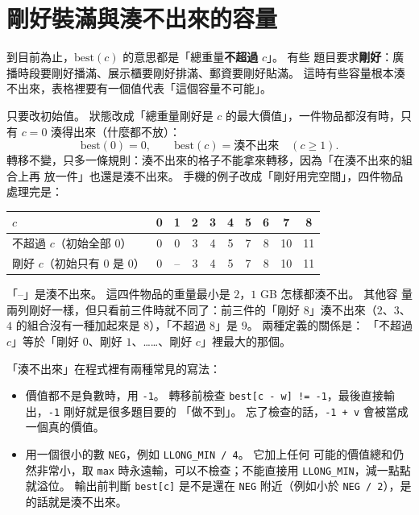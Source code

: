 \section{剛好裝滿與湊不出來的容量}
\label{sec:knap-exact}

到目前為止，$\mathrm{best}(c)$ 的意思都是「總重量\textbf{不超過} $c$」。 有些
題目要求\textbf{剛好}：廣播時段要剛好播滿、展示櫃要剛好排滿、郵資要剛好貼滿。
這時有些容量根本湊不出來，表格裡要有一個值代表「這個容量不可能」。

只要改初始值。 狀態改成「總重量剛好是 $c$ 的最大價值」，一件物品都沒有時，只
有 $c = 0$ 湊得出來（什麼都不放）：
\[
\mathrm{best}(0) = 0,\qquad \mathrm{best}(c) = \text{湊不出來}\quad (c \ge 1).
\]
轉移不變，只多一條規則：湊不出來的格子不能拿來轉移，因為「在湊不出來的組合上再
放一件」也還是湊不出來。 手機的例子改成「剛好用完空間」，四件物品處理完是：

\begin{center}
\begin{tabular}{l|ccccccccc}
\toprule
$c$ & 0 & 1 & 2 & 3 & 4 & 5 & 6 & 7 & 8 \\
\midrule
不超過 $c$（初始全部 $0$） & 0 & 0 & 3 & 4 & 5 & 7 & 8 & 10 & 11 \\
剛好 $c$（初始只有 $0$ 是 $0$） & 0 & -- & 3 & 4 & 5 & 7 & 8 & 10 & 11 \\
\bottomrule
\end{tabular}
\end{center}

「--」是湊不出來。 這四件物品的重量最小是 $2$，$1$ GB 怎樣都湊不出。 其他容
量兩列剛好一樣，但只看前三件時就不同了：前三件的「剛好 $8$」湊不出來（$2$、$3$、
$4$ 的組合沒有一種加起來是 $8$），「不超過 $8$」是 $9$。 兩種定義的關係是：
「不超過 $c$」等於「剛好 $0$、剛好 $1$、……、剛好 $c$」裡最大的那個。

「湊不出來」在程式裡有兩種常見的寫法：

\begin{itemize}
\item 價值都不是負數時，用 \texttt{-1}。 轉移前檢查
\texttt{best[c - w] != -1}，最後直接輸出，\texttt{-1} 剛好就是很多題目要的
「做不到」。 忘了檢查的話，\texttt{-1 + v} 會被當成一個真的價值。
\item 用一個很小的數 \texttt{NEG}，例如 \texttt{LLONG\_MIN / 4}。 它加上任何
可能的價值總和仍然非常小，取 \texttt{max} 時永遠輸，可以不檢查；不能直接用
\texttt{LLONG\_MIN}，減一點點就溢位。 輸出前判斷 \texttt{best[c]} 是不是還在
\texttt{NEG} 附近（例如小於 \texttt{NEG / 2}），是的話就是湊不出來。
\end{itemize}


